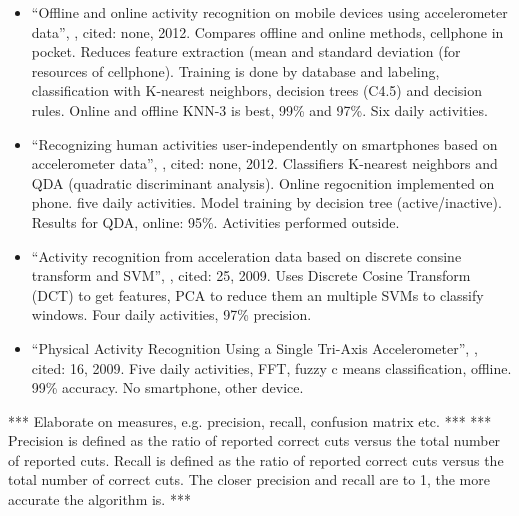 \begin{itemize}
  \item ``Offline and online activity recognition on mobile devices using accelerometer data'', \cite{duque2012offline}, cited: none, 2012. Compares offline and online methods, cellphone in pocket. Reduces feature extraction (mean and standard deviation (for resources of cellphone). Training is done by database and labeling, classification with K-nearest neighbors, decision trees (C4.5) and decision rules. Online and offline KNN-3 is best, 99\% and 97\%. Six daily activities.
  \item ``Recognizing human activities user-independently on smartphones based on accelerometer data'', \cite{siirtola2012recognizing}, cited: none, 2012. Classifiers K-nearest neighbors and QDA (quadratic discriminant analysis). Online regocnition implemented on phone. five daily activities. Model training by decision tree (active/inactive). Results for QDA, online: 95\%. Activities performed outside.
  \item ``Activity recognition from acceleration data based on discrete consine transform and SVM'', \cite{he2009activity}, cited: 25, 2009. Uses Discrete Cosine Transform (DCT) to get features, PCA to reduce them an multiple SVMs to classify windows. Four daily activities, 97\% precision.
  \item ``Physical Activity Recognition Using a Single Tri-Axis Accelerometer'', \cite{lee2178physical}, cited: 16, 2009. Five daily activities, FFT, fuzzy c means classification, offline. 99\% accuracy. No smartphone, other device.
\end{itemize}





*** Elaborate on measures, e.g. precision, recall, confusion matrix etc.  ***
*** Precision is defined as the ratio of reported correct cuts versus the total number of reported cuts. Recall is defined as the ratio of reported correct cuts versus the total number of correct cuts. The closer precision and recall are to 1, the more accurate the algorithm is. ***